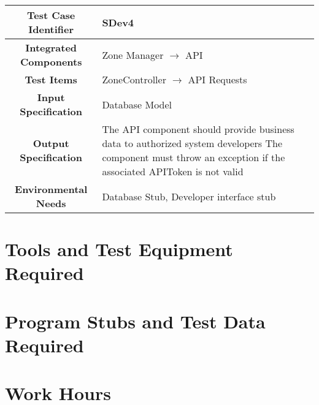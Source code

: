 \documentclass[11pt, a4paper,titlepage]{article}
\begin{document}
			\begin{tabularx}{\textwidth}{| c|X|}
				\hline \textbf{Test Case Identifier} & SDev4 \\
				\hline \textbf{Integrated Components} & Zone Manager $\rightarrow $ API \\
				\hline \textbf{Test Items} & ZoneController $\rightarrow $ API Requests \\
				\hline \textbf{Input Specification} & Database Model \\
				\hline \textbf{Output Specification} & The API component should provide business data to authorized system developers
				\newline The component must throw an exception if the associated APIToken is not valid \\
				\hline \textbf{Environmental Needs} & Database Stub, Developer interface stub \\
				\hline
			\end{tabularx}
			\newline
			
	\newpage
	\section{Tools and Test Equipment Required}
	\section{Program Stubs and Test Data Required}
	\section{Work Hours}
	
\end{document}
